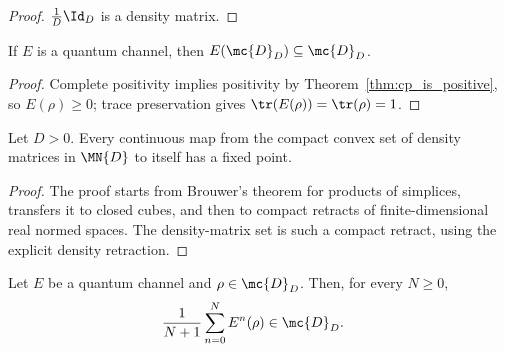 \begin{proof}\leanok
    $\frac{1}{D}\Id_D$ is a density matrix.
\end{proof}

\begin{theorem}\label{thm:channel_preserves_density}
    \leanok
    If $E$ is a quantum channel, then
    $E(\mc{D}_D) \subseteq \mc{D}_D$.
\end{theorem}

\begin{proof}\leanok{}
    Complete positivity implies positivity by
    Theorem~\ref{thm:cp_is_positive}, so $E(\rho) \ge 0$; trace preservation
    gives $\tr(E(\rho)) = \tr(\rho) = 1$.
\end{proof}

\begin{theorem}%
    \label{thm:brouwer_density_matrices}
    \leanok
    Let $D > 0$. Every continuous map from the compact convex set of
    density matrices in $\MN{D}$ to itself has a fixed point.
\end{theorem}

\begin{proof}
    \leanok
    The proof starts from Brouwer's theorem for products of simplices,
    transfers it to closed cubes, and then to compact retracts of
    finite-dimensional real normed spaces. The density-matrix set is
    such a compact retract, using the explicit density retraction.
\end{proof}

\begin{lemma}
    \label{lem:cesaro_mean_density}
    \leanok
    Let $E$ be a quantum channel and $\rho\in\mc{D}_D$. Then, for every
    $N\geq0$,
    \begin{align}
        \frac{1}{N+1}\sum_{n=0}^{N}E^n(\rho)
         & \in\mc{D}_D.
        \label{eq:qpf_cesaro_density}
    \end{align}
\end{lemma}

